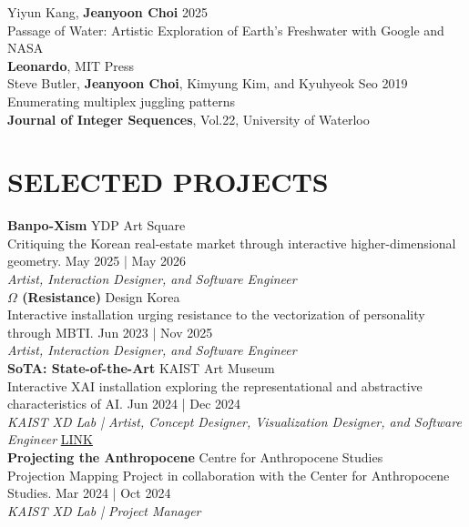 \documentclass[a4paper,9pt]{extarticle}
\begin{document}
\noindent
Yiyun Kang, \textbf{Jeanyoon Choi} \hfill 2025\\ %
{Passage of Water: Artistic Exploration of Earth's Freshwater with Google and NASA} \\
\textbf{Leonardo}, MIT Press \hfill \\

\noindent
Steve Butler, \textbf{Jeanyoon Choi}, Kimyung Kim, and Kyuhyeok Seo \hfill 2019\\ %
{Enumerating multiplex juggling patterns} \\
\textbf{Journal of Integer Sequences}, Vol.22, University of Waterloo \hfill \\



\section*{SELECTED PROJECTS}
\label{SELECTED_PROJECTS}


\noindent
\textbf{Banpo-Xism} \hfill YDP Art Square\\ %
Critiquing the Korean real-estate market through interactive higher-dimensional geometry. \hfill May 2025 | May 2026 \\
\textit{Artist, Interaction Designer, and Software Engineer} \hfill \\



\noindent
\textbf{$\Omega$ (Resistance)} \hfill Design Korea\\ %
Interactive installation urging resistance to the vectorization of personality through MBTI. \hfill Jun 2023 | Nov 2025 \\
\textit{Artist, Interaction Designer, and Software Engineer} \hfill \\

\noindent
\textbf{SoTA: State-of-the-Art} \hfill KAIST Art Museum\\ %
{Interactive XAI installation exploring the representational and abstractive characteristics of AI.} \hfill Jun 2024 | Dec 2024 \\
\textit{KAIST XD Lab | Artist, Concept Designer, Visualization Designer, and Software Engineer} \hfill \href{https://sota-xdlab.net/}{LINK} \\

\noindent
\textbf{Projecting the Anthropocene} \hfill Centre for Anthropocene Studies\\ %
{Projection Mapping Project in collaboration with the Center for Anthropocene Studies.} \hfill Mar 2024 | Oct 2024 \\
\textit{KAIST XD Lab | Project Manager} \\
\end{document}
